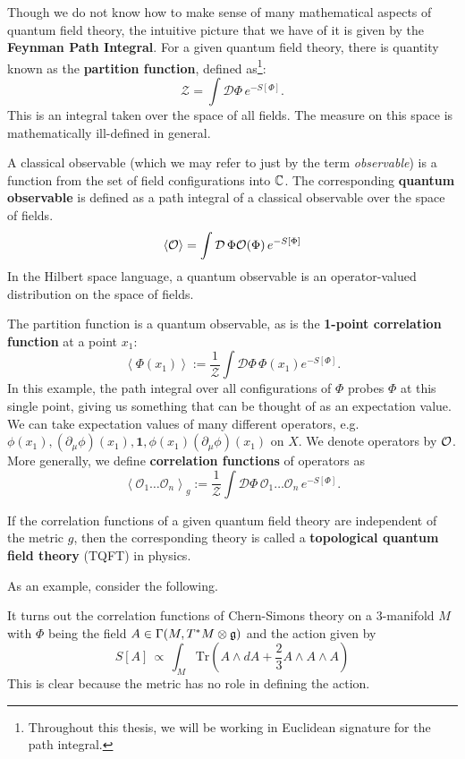 		Though we do not know how to make sense of many mathematical aspects of quantum field theory, the intuitive picture that we have of it is given by the \textbf{Feynman Path Integral}. For a given quantum field theory, there is quantity known as the \textbf{partition function}, defined as\footnote{Throughout this thesis, we will be working in Euclidean signature for the path integral.}:
		\begin{equation}\label{eq:Z}
			\mathcal Z = \int \mathcal D\Phi\, e^{- S[\Phi]}.
		\end{equation}
		This is an integral taken over the space of all fields. The measure on this space is mathematically ill-defined in general. 
		\begin{phys}
			A classical observable (which we may refer to just by the term \emph{observable}) is a function from the set of field configurations into $\mathbb{C}$. The corresponding \textbf{quantum observable} is defined as a path integral of a classical observable over the space of fields. 
			\[
				\left< \mathcal{O} \right> = \int \mathcal D \, \Phi \mathcal{O}(\Phi) \, e^{-S[\Phi]}
			\]
			In the Hilbert space language, a quantum observable is an operator-valued distribution on the space of fields. 
		\end{phys}
		The partition function is a quantum observable, as is the \textbf{1-point correlation function} at a point $x_1$:
		$$\left< \Phi(x_1) \right> := \frac{1}{\mathcal Z} \int \mathcal D\Phi \, \Phi(x_1) e^{-S[\Phi]}.$$
		In this example, the path integral over all configurations of $\Phi$ probes $\Phi$ at this single point, giving us something that can be thought of as an expectation value. We can take expectation values of many different operators, e.g. $\phi(x_1), (\partial_\mu \phi)(x_1), \mathbf{1}, \phi(x_1) (\partial_\mu \phi)(x_1)$ on $X$. We denote operators by $\mathcal{O}$. More generally, we define \textbf{correlation functions} of operators as 
		$$\left< \mathcal O_1 \dots \mathcal O_n \right>_g := \frac{1}{\mathcal Z} \int \mathcal D\Phi \, \mathcal O_1 \dots \mathcal O_n \, e^{-S[\Phi]}.$$
		\begin{phys}[TQFT]
			If the correlation functions of a given quantum field theory are independent of the metric $g$, then the corresponding theory is called a \textbf{topological quantum field theory} (TQFT) in physics.
		\end{phys}
		As an example, consider the following.
		\begin{eg}
			It turns out the correlation functions of Chern-Simons theory on a 3-manifold $M$ with $\Phi$ being the field $A \in \Gamma(M, T^* M \otimes \frak g)$ and the action given by
			$$S[A] \, \propto\,  \int_{M} \mathrm{Tr}\left(A \wedge dA + \frac23 A \wedge A \wedge A \right)$$
			This is clear because the metric has no role in defining the action.
		\end{eg}
		

